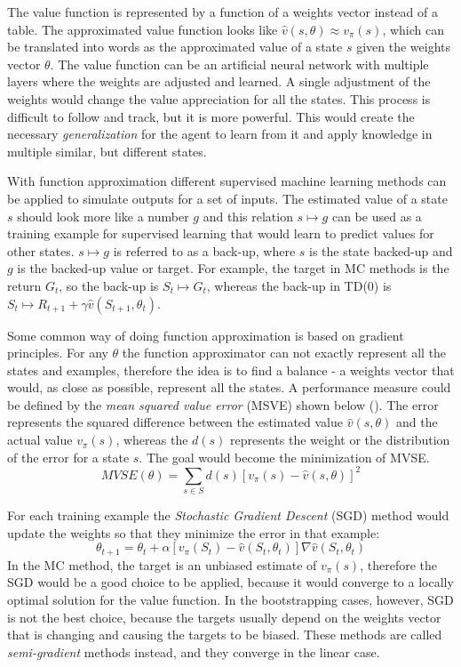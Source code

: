 The value function is represented by a function of a weights vector instead of a table. The approximated value function looks like $\hat{v}(s,\theta)\approx v_{\pi}(s)$, which can be translated into words as the approximated value of a state $s$ given the weights vector $\theta$. The value function can be an artificial neural network with multiple layers where the weights are adjusted and learned. A single adjustment of the weights would change the value appreciation for all the states. This process is difficult to follow and track, but it is more powerful. This would create the necessary \textit{generalization} for the agent to learn from it and apply knowledge in multiple similar, but different states.

With function approximation different supervised machine learning methods can be applied to simulate outputs for a set of inputs. The estimated value of a state $s$ should look more like a number $g$ and this relation $s \mapsto g$ can be used as a training example for supervised learning that would learn to predict values for other states. $s \mapsto g$ is referred to as a back-up, where $s$ is the state backed-up and $g$ is the backed-up value or target. For example, the target in MC methods is the return $G_{t}$, so the back-up is $S_{t} \mapsto G_{t}$, whereas the back-up in TD(0) is $S_{t} \mapsto R_{t+1}+\gamma\hat{v}(S_{t+1}, \theta_{t}) $.

Some common way of doing function approximation is based on gradient principles. For any $\theta$ the function approximator can not exactly represent all the states and examples, therefore the idea is to find a balance - a weights vector that would, as close as possible, represent all the states. A performance measure could be defined by the \textit{mean squared value error} (MSVE) shown below (). The error represents the squared difference between the estimated value $\hat{v}(s,\theta)$ and the actual value $v_{\pi}(s)$, whereas the $d(s)$ represents the weight or the distribution of the error for a state $s$. The goal would become the minimization of MVSE.
\begin{equation}\label{MSVE}
MVSE(\theta)=\sum_{s\in S} d(s) \left [ v_{\pi}(s) - \hat{v}(s,\theta) \right ]^{2}
\end{equation}

For each training example the \textit{Stochastic Gradient Descent} (SGD) method would update the weights so that they minimize the error in that example:
\begin{equation}\label{SGD}
\theta_{t+1}=\theta_{t}+\alpha \left [ v_{\pi}(S_{t}) - \hat{v}(S_{t},\theta_{t}) \right ]\nabla\hat{v}(S_{t},\theta_{t})
\end{equation}
In the MC method, the target is an unbiased estimate of $v_{\pi}(s)$, therefore the SGD would be a good choice to be applied, because it would converge to a locally optimal solution for the value function. In the bootstrapping cases, however, SGD is not the best choice, because the targets usually depend on the weights vector that is changing and causing the targets to be biased. These methods are called \textit{semi-gradient} methods instead, and they converge in the linear case.

